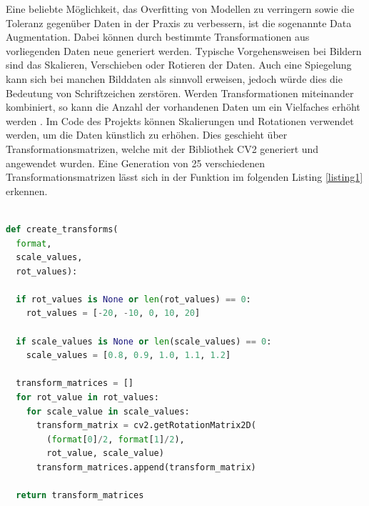 \documentclass[twoside,a4paper]{IEEEtran}
\begin{document}
Eine beliebte Möglichkeit, das Overfitting von Modellen zu verringern sowie die Toleranz gegenüber Daten in der Praxis zu verbessern, ist die sogenannte Data Augmentation. Dabei können durch bestimmte Transformationen aus vorliegenden Daten neue generiert werden. Typische Vorgehensweisen bei Bildern sind das Skalieren, Verschieben oder Rotieren der Daten. Auch eine Spiegelung kann sich bei manchen Bilddaten als sinnvoll erweisen, jedoch würde dies die Bedeutung von Schriftzeichen zerstören. Werden Transformationen miteinander kombiniert, so kann die Anzahl der vorhandenen Daten um ein Vielfaches erhöht werden \cite[S.311]{MACHINE_LEARNING}. Im Code des Projekts können Skalierungen und Rotationen verwendet werden, um die Daten künstlich zu erhöhen. Dies geschieht über Transformationsmatrizen, welche mit der Bibliothek CV2 generiert und angewendet wurden. Eine Generation von 25 verschiedenen Transformationsmatrizen lässt sich in der Funktion im folgenden Listing \ref{listing1} erkennen.
\begin{lstlisting}[language=python,label=listing1,caption={Python-Code für die Generierung von Transformationsmatrizen.}]
	
def create_transforms(
  format, 
  scale_values, 
  rot_values):
  
  if rot_values is None or len(rot_values) == 0:
    rot_values = [-20, -10, 0, 10, 20]
	
  if scale_values is None or len(scale_values) == 0:
    scale_values = [0.8, 0.9, 1.0, 1.1, 1.2]
	
  transform_matrices = []
  for rot_value in rot_values:
    for scale_value in scale_values:
      transform_matrix = cv2.getRotationMatrix2D(
        (format[0]/2, format[1]/2),
        rot_value, scale_value)
      transform_matrices.append(transform_matrix)

  return transform_matrices
\end{lstlisting}
\end{document}

